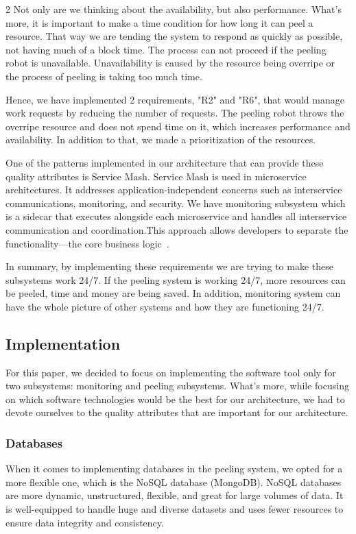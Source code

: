 \documentclass{article}
\begin{document}
\begin{multicols}{2}
Not only are we thinking about the availability, but also performance. What's more, it is important to make a time condition for how long it can peel a resource. That way we are tending the system to respond as quickly as possible, not having much of a block time. The process can not proceed if the peeling robot is unavailable. Unavailability is caused by the resource being overripe or the process of peeling is taking too much time. 

Hence, we have implemented 2 requirements, "R2" and "R6", that would manage work requests by reducing the number of requests. The peeling robot throws the overripe resource and does not spend time on it, which increases performance and availability. In addition to that, we made a prioritization of the resources. 

One of the patterns implemented in our architecture that can provide these quality attributes is Service Mash. Service Mash is used in microservice architectures. It addresses application-independent concerns such as interservice communications, monitoring, and security. We have monitoring subsystem which is a sidecar that executes alongside each microservice and handles all interservice communication and coordination.This approach allows developers to separate the functionality—the core business logic~\cite{b1}.

In summary, by implementing these requirements we are trying to make these subsystems work 24/7. If the peeling system is working 24/7, more resources can be peeled, time and money are being saved. In addition, monitoring system can have the whole picture of other systems and how they are functioning 24/7.

\subsection{Implementation}
\color{black}

For this paper, we decided to focus on implementing the software tool only for two subsystems: monitoring and peeling subsystems. 
What's more, while focusing on which software technologies would be the best for our architecture, we had to devote ourselves to the quality attributes that are important for our architecture. 

\subsubsection{Databases}
When it comes to implementing databases in the peeling system, we opted for a more flexible one, which is the NoSQL database (MongoDB). NoSQL databases are more dynamic, unstructured, flexible, and great for large volumes of data. It is well-equipped to handle huge and diverse datasets and uses fewer resources to ensure data integrity and consistency. 


\end{multicols}
\end{document}
